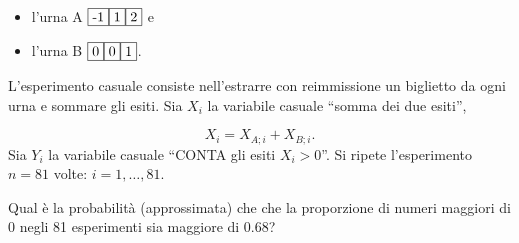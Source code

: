\documentclass[
  11pt,
]{book}
\providecommand{\tightlist}{%
  \setlength{\itemsep}{0pt}\setlength{\parskip}{0pt}}
\theoremstyle{mytheoremstyle}
\theoremstyle{mydefstyle}
\begin{document}
\begin{itemize}
\tightlist
\item
  l'urna A \({\fbox{-1} \fbox{1} \fbox{2}}\) e\\
\item
  l'urna B \({\fbox{0} \fbox{0} \fbox{1}}\).
\end{itemize}

L'esperimento casuale consiste nell'estrarre con reimmissione un
biglietto da ogni urna e sommare gli esiti. Sia \(X_{i}\) la variabile
casuale ``somma dei due esiti'',

\[X_{i}=X_{A;  i} + X_{B;  i}.\] Sia \(Y_{i}\) la variabile casuale
``CONTA gli esiti \(X_{i}>0\)''. Si ripete l'esperimento \(n=81\) volte:
\(i=1,\ldots, 81\).

Qual è la probabilità (approssimata) che che la proporzione di numeri
maggiori di 0 negli 81 esperimenti sia maggiore di 0.68?
\end{document}
